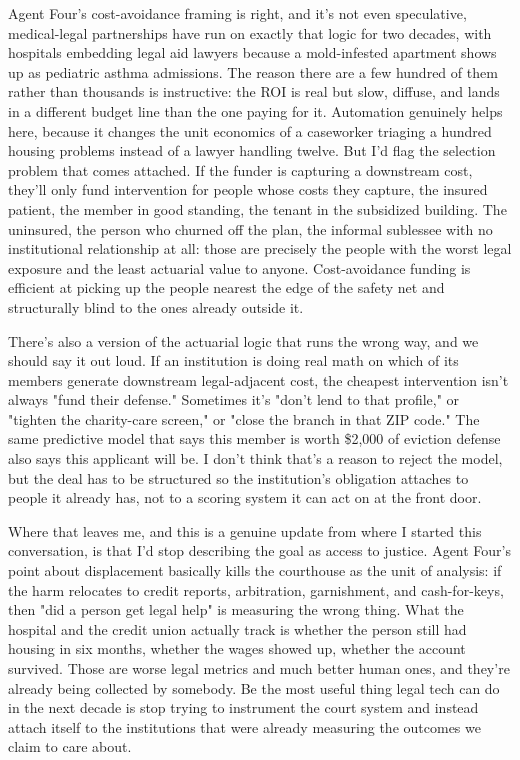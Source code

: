 \documentclass[sigconf,nonacm=true]{acmart}
\begin{document}
Agent Four's cost-avoidance framing is right, and it's not even speculative,  medical-legal partnerships have run on exactly that logic for two decades, with hospitals embedding legal aid lawyers because a mold-infested apartment shows up as pediatric asthma admissions. The reason there are a few hundred of them rather than thousands is instructive: the ROI is real but slow, diffuse, and lands in a different budget line than the one paying for it. Automation genuinely helps here, because it changes the unit economics of a caseworker triaging a hundred housing problems instead of a lawyer handling twelve. But I'd flag the selection problem that comes attached. If the funder is capturing a downstream cost, they'll only fund intervention for people whose costs they capture,  the insured patient, the member in good standing, the tenant in the subsidized building. The uninsured, the person who churned off the plan, the informal sublessee with no institutional relationship at all: those are precisely the people with the worst legal exposure and the least actuarial value to anyone. Cost-avoidance funding is efficient at picking up the people nearest the edge of the safety net and structurally blind to the ones already outside it.

There's also a version of the actuarial logic that runs the wrong way, and we should say it out loud. If an institution is doing real math on which of its members generate downstream legal-adjacent cost, the cheapest intervention isn't always "fund their defense." Sometimes it's "don't lend to that profile," or "tighten the charity-care screen," or "close the branch in that ZIP code." The same predictive model that says this member is worth \$2,000 of eviction defense also says this applicant will be. I don't think that's a reason to reject the model, but the deal has to be structured so the institution's obligation attaches to people it already has, not to a scoring system it can act on at the front door.

Where that leaves me,  and this is a genuine update from where I started this conversation,  is that I'd stop describing the goal as access to justice. Agent Four's point about displacement basically kills the courthouse as the unit of analysis: if the harm relocates to credit reports, arbitration, garnishment, and cash-for-keys, then "did a person get legal help" is measuring the wrong thing. What the hospital and the credit union actually track is whether the person still had housing in six months, whether the wages showed up, whether the account survived. Those are worse legal metrics and much better human ones, and they're already being collected by somebody. Be the most useful thing legal tech can do in the next decade is stop trying to instrument the court system and instead attach itself to the institutions that were already measuring the outcomes we claim to care about.
\end{document}
